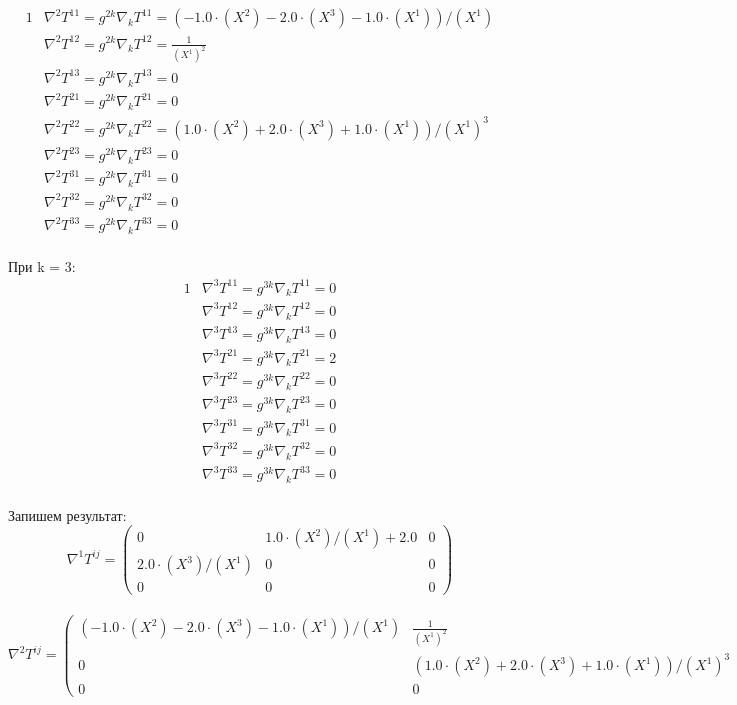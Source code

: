 \documentclass[a4paper, 12pt, oneside]{article}
\begin{document}
\begin{alignat*}{1}
  & \nabla^2T^{11} = g^{2k}\nabla_kT^{11} = (-1.0\cdot (X^2) - 2.0\cdot (X^3) - 1.0\cdot (X^1))/(X^1) \\
  & \nabla^2T^{12} = g^{2k}\nabla_kT^{12} = \frac{1}{(X^1)^2} \\
  & \nabla^2T^{13} = g^{2k}\nabla_kT^{13} = 0 \\
  & \nabla^2T^{21} = g^{2k}\nabla_kT^{21} = 0 \\
  & \nabla^2T^{22} = g^{2k}\nabla_kT^{22} = (1.0\cdot (X^2) + 2.0\cdot (X^3) + 1.0\cdot (X^1))/(X^1)^3 \\
  & \nabla^2T^{23} = g^{2k}\nabla_kT^{23} = 0 \\
  & \nabla^2T^{31} = g^{2k}\nabla_kT^{31} = 0 \\
  & \nabla^2T^{32} = g^{2k}\nabla_kT^{32} = 0 \\
  & \nabla^2T^{33} = g^{2k}\nabla_kT^{33} = 0 
\end{alignat*}\\
При k = 3:\\
\begin{alignat*}{1}
  & \nabla^3T^{11} = g^{3k}\nabla_kT^{11} = 0 \\
  & \nabla^3T^{12} = g^{3k}\nabla_kT^{12} = 0 \\
  & \nabla^3T^{13} = g^{3k}\nabla_kT^{13} = 0 \\
  & \nabla^3T^{21} = g^{3k}\nabla_kT^{21} = 2 \\
  & \nabla^3T^{22} = g^{3k}\nabla_kT^{22} = 0 \\
  & \nabla^3T^{23} = g^{3k}\nabla_kT^{23} = 0 \\
  & \nabla^3T^{31} = g^{3k}\nabla_kT^{31} = 0 \\
  & \nabla^3T^{32} = g^{3k}\nabla_kT^{32} = 0 \\
  & \nabla^3T^{33} = g^{3k}\nabla_kT^{33} = 0 
\end{alignat*}\\
Запишем результат:\\
\[
\nabla^1T^{ij} = \begin{pmatrix}
	0 & 1.0\cdot (X^2)/(X^1) + 2.0 & 0\\
	2.0\cdot (X^3)/(X^1) & 0 & 0\\
	0 & 0 & 0
\end{pmatrix}
\]\\
\[
\nabla^2T^{ij} = \begin{pmatrix}
	(-1.0\cdot (X^2) - 2.0\cdot (X^3) - 1.0\cdot (X^1))/(X^1) & \frac{1}{(X^1)^2} & 0\\
	0 & (1.0\cdot (X^2) + 2.0\cdot (X^3) + 1.0\cdot (X^1))/(X^1)^3 & 0\\
	0 & 0 & 0
\end{pmatrix}
\]\\
\end{document}
